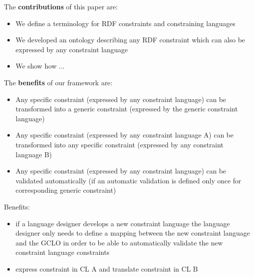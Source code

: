 \documentclass{llncs}
\begin{document}
The \textbf{contributions} of this paper are:
\begin{itemize}
	\item We define a terminology for RDF constraints and constraining languages
	\item We developed an ontology describing any RDF constraint which can also be expressed by any constraint language
	\item We show how ...
\end{itemize}

The \textbf{benefits} of our framework are:
\begin{itemize}
	\item Any specific constraint (expressed by any constraint language) can be transformed into a generic constraint (expressed by the generic constraint language)
	\item Any specific constraint (expressed by any constraint language A) can be transformed into any specific constraint (expressed by any constraint language B)
	\item Any specific constraint (expressed by any constraint language) can be validated automatically (if an automatic validation is defined only once for corresponding generic constraint)
\end{itemize}

Benefits:
\begin{itemize}
	\item if a language designer develops a new constraint language the language designer only needs to define a mapping between the new constraint language and the GCLO 
	in order to be able to automatically validate the new constraint language constraints
\end{itemize}

\begin{itemize}
  \item express constraint in CL A and translate constraint in CL B
\end{itemize}
\end{document}
